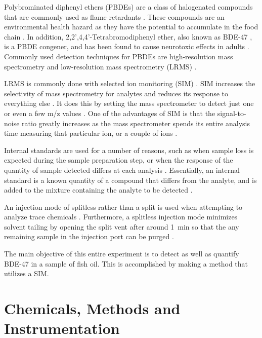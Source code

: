 \documentclass[a4paper, 12pt]{article}
\begin{document}
Polybrominated diphenyl ethers (PBDEs) are a class of halogenated compounds that are commonly used as flame retardants \cite{bjorklund_mass_2003}. These compounds are an environmental health hazard as they have the potential to accumulate in the food chain \cite{thomsen_comparing_2002}. In addition, 2,2',4,4'-Tetrabromodiphenyl ether, also known as BDE-47 \cite{rat}, is a PBDE congener, and has been found to cause neurotoxic effects in adults \cite{thomsen_comparing_2002}. Commonly used detection techniques for PBDEs are high-resolution mass spectrometry and low-resolution mass spectrometry (LRMS) \cite{bjorklund_mass_2003}.

LRMS is commonly done with selected ion monitoring (SIM) \cite{bjorklund_mass_2003}. SIM increases the selectivity of mass spectrometry for analytes and reduces its response to everything else \cite{harris}. It does this by setting the mass spectrometer to detect just one or even a few m/z values \cite{harris}. One of the advantages of SIM is that the signal-to-noise ratio greatly increases as the mass spectrometer spends its entire analysis time measuring that particular ion, or a couple of ions \cite{harris}.

Internal standards are used for a number of reasons, such as when sample loss is expected during the sample preparation step, or when the response of the quantity of sample detected differs at each analysis \cite{harris}. Essentially, an internal standard is a known quantity of a compound that differs from the analyte, and is added to the mixture containing the analyte to be detected \cite{harris}. 

An injection mode of splitless rather than a split is used when attempting to analyze trace chemicals \cite{harris}. Furthermore, a splitless injection mode minimizes solvent tailing by opening the split vent after around \SI{1}{min} so that the any remaining sample in the injection port can be purged \cite{vitha_chromatography:_2017}.

The main objective of this entire experiment is to detect as well as quantify BDE-47 in a sample of fish oil. This is accomplished by making a method that utilizes a SIM.


\section{Chemicals, Methods and Instrumentation}
\end{document}
